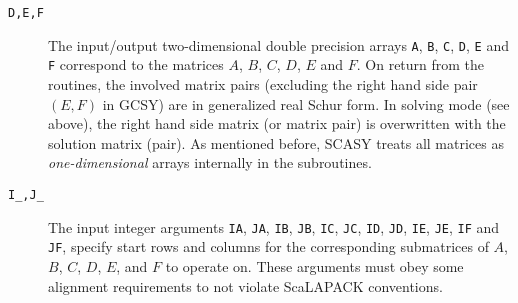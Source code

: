 \documentclass[11pt]{article}
\begin{document}
\begin{description}
\item[\texttt{D,E,F}] The input/output two-dimensional double
precision arrays \texttt{A}, \texttt{B}, \texttt{C}, \texttt{D},
\texttt{E} and \texttt{F} correspond to the matrices $A$, $B$,
$C$, $D$, $E$ and $F$. On return from the routines, the involved
matrix pairs (excluding the right hand side pair $(E,F)$ in GCSY)
are in generalized real Schur form. In solving mode (see above),
the right hand side matrix (or matrix pair) is overwritten with
the solution matrix (pair). As mentioned before, SCASY treats all
matrices as {\em one-dimensional} arrays internally in the
subroutines.

\item[\texttt{I\_,J\_}] The input integer arguments \texttt{IA},
\texttt{JA}, \texttt{IB}, \texttt{JB}, \texttt{IC}, \texttt{JC},
\texttt{ID}, \texttt{JD}, \texttt{IE}, \texttt{JE}, \texttt{IF}
and \texttt{JF}, specify start rows and columns for the
corresponding submatrices of $A$, $B$, $C$, $D$, $E$, and $F$ to
operate on. These arguments must obey some alignment requirements
to not violate ScaLAPACK conventions.

\end{description}
%
\end{document}
